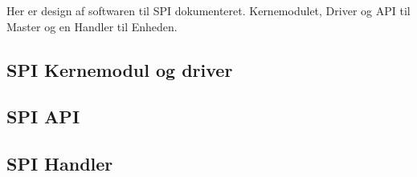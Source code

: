 Her er design af softwaren til SPI dokumenteret. Kernemodulet, Driver og API til Master og en Handler til Enheden.


\subsection{SPI Kernemodul og driver}



\subsection{SPI API}




\subsection{SPI Handler}

